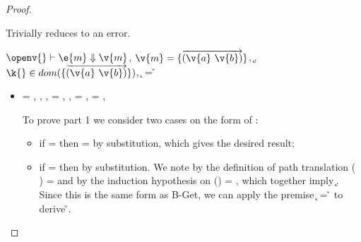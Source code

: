 \begin{lemma}
\begin{proof}
\begin{case}[BE-IsA2]
        Trivially reduces to an error.
      \end{case}

\begin{case}[B-Get]
      $\opsem {\openv{}} {\e{m}}{\v{m}}$,
        $\v{m} = {\curlymap{\overrightarrow{({\v{a}}\ {\v{b}})}}}$,
         \opsem {\openv{}} {} {\k{}},
         $\keyinmap{\k{}}{\curlymap{\overrightarrow{({\v{a}}\ {\v{b}})}}}$,
          {\k{}} = {\v{}}

  \begin{itemize}
    \item[]
      \begin{subcase}[T-GetHMap]
  \ep{} = { {}},
  \judgementrewrite {\propenv{}} {} {\Unionsplice {\overrightarrow {\HMapgeneric {\mandatory{}} {\absent{}}}}}
           { {}}
           {}
           {},
  \judgementtworewrite {\propenv{}} {} {}{},
  \e{} = { {}},
   ,
  \thenprop{\prop{}} = {\topprop{}},
  \elseprop{\prop{}} = {\topprop{}},
                        {\object{}}


         To prove part 1 we consider two cases on the form of : 
         \begin{itemize}
           \item
         if {} = \emptyobject{}
         then \object{} = \emptyobject{} by substitution, which gives the desired result;
           \item
         if  = { {}}
         then  by substitution.
         We note by the definition of path translation
         {\openv{}}({ {}}) =
         {}
         and by the induction hypothesis on 
         {{\openv{}}()} = {},
         which together imply 
         \inopenv {\openv{}} {\object{}} { {\k{}}}.
         Since this is the same form as B-Get, we can apply the premise
          {\k{}} = {\v{}}
         to derive \inopenv {\openv{}} {\object{}} {\v{}}.
         \end{itemize}
         

\end{subcase}
\end{itemize}
\end{case}
\end{proof}
\end{lemma}
